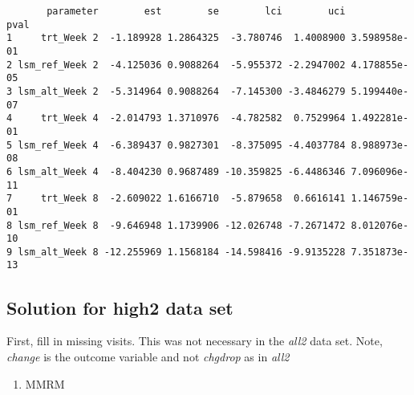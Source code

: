 \documentclass[
  letterpaper,
  DIV=11,
  numbers=noendperiod]{scrreprt}
\newenvironment{Shaded}{\begin{snugshade}}{\end{snugshade}}
\newcommand{\AttributeTok}[1]{\textcolor[rgb]{0.40,0.45,0.13}{#1}}
\newcommand{\FunctionTok}[1]{\textcolor[rgb]{0.28,0.35,0.67}{#1}}
\newcommand{\NormalTok}[1]{\textcolor[rgb]{0.00,0.23,0.31}{#1}}
\newcommand{\OtherTok}[1]{\textcolor[rgb]{0.00,0.23,0.31}{#1}}
\newcommand{\SpecialCharTok}[1]{\textcolor[rgb]{0.37,0.37,0.37}{#1}}
\newcommand{\StringTok}[1]{\textcolor[rgb]{0.13,0.47,0.30}{#1}}
\providecommand{\tightlist}{%
  \setlength{\itemsep}{0pt}\setlength{\parskip}{0pt}}\usepackage{longtable,booktabs,array}
\begin{document}
\begin{verbatim}
       parameter        est        se        lci        uci         pval
1     trt_Week 2  -1.189928 1.2864325  -3.780746  1.4008900 3.598958e-01
2 lsm_ref_Week 2  -4.125036 0.9088264  -5.955372 -2.2947002 4.178855e-05
3 lsm_alt_Week 2  -5.314964 0.9088264  -7.145300 -3.4846279 5.199440e-07
4     trt_Week 4  -2.014793 1.3710976  -4.782582  0.7529964 1.492281e-01
5 lsm_ref_Week 4  -6.389437 0.9827301  -8.375095 -4.4037784 8.988973e-08
6 lsm_alt_Week 4  -8.404230 0.9687489 -10.359825 -6.4486346 7.096096e-11
7     trt_Week 8  -2.609022 1.6166710  -5.879658  0.6616141 1.146759e-01
8 lsm_ref_Week 8  -9.646948 1.1739906 -12.026748 -7.2671472 8.012076e-10
9 lsm_alt_Week 8 -12.255969 1.1568184 -14.598416 -9.9135228 7.351873e-13
\end{verbatim}

\hypertarget{solution-for-high2-data-set}{%
\subsection{Solution for high2 data
set}\label{solution-for-high2-data-set}}

First, fill in missing visits. This was not necessary in the \emph{all2}
data set. Note, \emph{change} is the outcome variable and not
\emph{chgdrop} as in \emph{all2}

\begin{Shaded}
\end{Shaded}

\begin{enumerate}
\def\labelenumi{\arabic{enumi}.}
\tightlist
\item
  MMRM
\end{enumerate}
\end{document}
